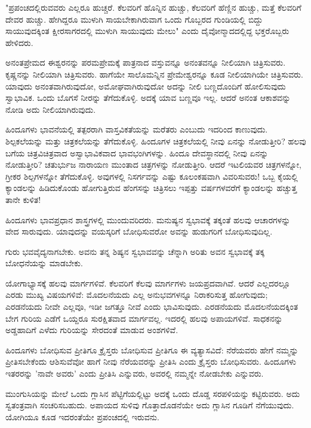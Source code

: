 "ಪ್ರಪಂಚದಲ್ಲಿರುವವರು ಎಲ್ಲರೂ ಹುಚ್ಚರೆ. ಕೆಲವರಿಗೆ ಹೊನ್ನಿನ ಹುಚ್ಚು, ಕೆಲವರಿಗೆ ಹೆಣ್ಣಿನ ಹುಚ್ಚು, ಮತ್ತೆ ಕೆಲವರಿಗೆ ದೇವರ ಹುಚ್ಚು. ಹೇಗಿದ್ದರೂ ಮುಳುಗಿ ಸಾಯಬೇಕಾಗಿರುವಾಗ ಒಂದು ಗೊಬ್ಬರದ ಗುಂಡಿಯಲ್ಲಿ ಬಿದ್ದು ಸಾಯುವುದಕ್ಕಿಂತ ಕ್ಷೀರಸಾಗರದಲ್ಲಿ ಮುಳುಗಿ ಸಾಯುವುದು ಮೇಲು" ಎಂದು ದೈವೋನ್ಮಾದದಲ್ಲಿದ್ದ ಭಕ್ತರೊಬ್ಬರು ಹೇಳಿದರು.

ಅನಂತಪ್ರೇಮದ ಈಶ್ವರನನ್ನು ಪರಮಪ್ರೇಮಕ್ಕೆ ಪಾತ್ರನಾದ ವಸ್ತುವನ್ನೂ ಅನಂತವನ್ನೂ ನೀಲಿಯಾಗಿ ಚಿತ್ರಿಸುವರು. ಕೃಷ್ಣನನ್ನು ನೀಲಿಯಾಗಿ ಚಿತ್ರಿಸುವರು. ಹಾಗೆಯೇ ಸಾಲೊಮನ್ನಿನ ಪ್ರೇಮೇಶ್ವರನ್ನೂ ಕೂಡ ನೀಲಿಯಾಗಿಯೇ ಚಿತ್ರಿಸುವರು. ಯಾವುದು ಅನಂತವಾಗಿರುವುದೋ, ಅಮೋಘವಾಗಿರುವುದೋ ಅದನ್ನು ನೀಲಿ ಬಣ್ಣದೊಂದಿಗೆ ಹೋಲಿಸುವುದು ಸ್ವಾಭಾವಿಕ. ಒಂದು ಬೊಗಸೆ ನೀರನ್ನು ತೆಗೆದುಕೊಳ್ಳಿ. ಅದಕ್ಕೆ ಯಾವ ಬಣ್ಣವೂ ಇಲ್ಲ. ಆದರೆ ಅನಂತ ಆಕಾಶವನ್ನು ನೋಡಿ ಅದು ನೀಲಿಯಾಗಿರುವುದು.

ಹಿಂದೂಗಳು ಭಾವನೆಯಲ್ಲಿ ತತ್ಪರರಾಗಿ ವಾಸ್ತವಿಕತೆಯನ್ನು ಮರೆತರು ಎಂಬುದು ಇದರಿಂದ ಕಾಣುವುದು. ಶಿಲ್ಪಕಲೆಯನ್ನು ಮತ್ತು ಚಿತ್ರಕಲೆಯನ್ನು ತೆಗೆದುಕೊಳ್ಳಿ. ಹಿಂದೂಗಳ ಚಿತ್ರಕಲೆಯಲ್ಲಿ ನೀವು ಏನನ್ನು ನೋಡುತ್ತೀರಿ? ಹಲವು ಬಗೆಯ ಚಿತ್ರವಿಚಿತ್ರವಾದ ಅಸ್ವಾಭಾವಿಕವಾದ ಭಾವಭಂಗಿಗಳನ್ನು. ಹಿಂದೂ ದೇವಸ್ಥಾನದಲ್ಲಿ ನೀವು ಏನನ್ನು ನೋಡುತ್ತೀರಿ? ಚತುರ್ಭುಜ ನಾರಾಯಣ ಮುಂತಾದ ಚಿತ್ರಗಳನ್ನು ನೋಡುತ್ತೀರಿ. ಆದರೆ ಇಟಲಿಯವರ ಚಿತ್ರಗಳನ್ನೋ, ಗ್ರೀಕರ ಶಿಲ್ಪಗಳನ್ನೋ ತೆಗೆದುಕೊಳ್ಳಿ. ಅವುಗಳಲ್ಲಿ ನಿಸರ್ಗವನ್ನು ಎಷ್ಟು ಕೂಲಂಕಷವಾಗಿ ವಿವರಿಸುವರು! ಒಬ್ಬ ಕೈಯಲ್ಲಿ ಕ್ಯಾಂಡಲನ್ನು ಹಿಡಿದುಕೊಂಡು ಹೋಗುತ್ತಿರುವ ಹೆಂಗಸನ್ನು ಚಿತ್ರಿಸಲು ಇಪ್ಪತ್ತು ವರ್ಷಗಳವರೆಗೆ ಕ್ಯಾಂಡಲನ್ನು ಹಚ್ಚುತ್ತ ತಾನೇ ಕುಳಿತ!

ಹಿಂದೂಗಳು ಭಾವಪ್ರಧಾನ ಶಾಸ್ತ್ರಗಳಲ್ಲಿ ಮುಂದುವರಿದರು. ಮನುಷ್ಯನ ಸ್ವಭಾವಕ್ಕೆ ತಕ್ಕಂತೆ ಹಲವು ಆಚಾರಗಳನ್ನು ವೇದ ಸಾರುವುದು. ಯಾವುದನ್ನು ವಯಸ್ಕರಿಗೆ ಬೋಧಿಸುವರೋ ಅವನ್ನು ಹುಡುಗರಿಗೆ ಬೋಧಿಸುವುದಿಲ್ಲ.

ಗುರು ಭವವೈದ್ಯನಾಗಬೇಕು. ಅವನು ತನ್ನ ಶಿಷ್ಯನ ಸ್ವಭಾವವನ್ನು ಚೆನ್ನಾಗಿ ಅರಿತು ಅವನ ಸ್ವಭಾವಕ್ಕೆ ತಕ್ಕ ಬೋಧನೆಯನ್ನು ಮಾಡಬೇಕು.

ಯೋಗಾಭ್ಯಾಸಕ್ಕೆ ಹಲವು ಮಾರ್ಗಗಳಿವೆ. ಕೆಲವರಿಗೆ ಕೆಲವು ಮಾರ್ಗಗಳು ಜಯಪ್ರದವಾಗಿವೆ. ಆದರೆ ಎಲ್ಲದರಲ್ಲೂ ಎರಡು ಮುಖ್ಯ ವಿಷಯಗಳಿವೆ: ಮೊದಲನೆಯದು ಎಲ್ಲ ಅನುಭವಗಳನ್ನೂ ನಿರಾಕರಿಸುತ್ತ ಹೋಗುವುದು; ಎರಡನೆಯದು ನೀವೇ ಎಲ್ಲವೂ, ಇಡೀ ಜಗತ್ತೂ ನೀವೆ ಎಂದು ಭಾವಿಸುವುದು. ಎರಡನೆಯದು ಮೊದಲನೆಯದಕ್ಕಿಂತ ಬೇಗ ಗುರಿಯ ಎಡೆಗೆ ಒಯ್ದರೂ ಸುರಕ್ಷಿತವಾದ ಮಾರ್ಗವಲ್ಲ. ಇದರಲ್ಲಿ ಹಲವು ಅಪಾಯಗಳಿವೆ. ಸಾಧಕನನ್ನು ಅಡ್ಡಹಾದಿಗೆ ಎಳೆದು ಗುರಿಯನ್ನು ಸೇರದಂತೆ ಮಾಡುವ ಅಂಶಗಳಿವೆ.

ಹಿಂದೂಗಳು ಬೋಧಿಸುವ ಪ್ರೀತಿಗೂ ಕ್ರೈಸ್ತರು ಬೋಧಿಸುವ ಪ್ರೀತಿಗೂ ಈ ವ್ಯತ್ಯಾಸವಿದೆ: ನೆರೆಯವರು ಹೇಗೆ ನಮ್ಮನ್ನು ಪ್ರೀತಿಸಬೇಕೆಂದು ಆಶಿಸುವೆವೋ ಹಾಗೆ ನೀವು ನೆರೆಯವರನ್ನು ಪ್ರೀತಿಸಿ ಎಂದು ಕ್ರೈಸ್ತರು ಬೋಧಿಸುವರು. ಹಿಂದೂಗಳು ಇತರರನ್ನು 'ನಾವೇ ಅವರು' ಎಂದು ಪ್ರೀತಿಸಿ ಎನ್ನುವರು, ಅವರಲ್ಲಿ ನಮ್ಮನ್ನೇ ನೋಡಬೇಕು ಎನ್ನುವರು.

ಮುಂಗುಸಿಯನ್ನು ಮೇಲೆ ಒಂದು ಗ್ಲಾಸಿನ ಪೆಟ್ಟಿಗೆಯಲ್ಲಿಟ್ಟು ಅದಕ್ಕೆ ಒಂದು ದೊಡ್ಡ ಸರಪಳಿಯನ್ನು ಕಟ್ಟಿರುವರು. ಅದು ಸ್ವತಂತ್ರವಾಗಿ ಸಂಚರಿಸಬಹುದು. ಅಪಾಯದ ಸುಳಿವು ಗೊತ್ತಾದೊಡನೆಯೇ ಅದು ಗ್ಲಾಸಿನ ಗೂಡಿಗೆ ನೆಗೆಯುವುದು. ಯೋಗಿಯೂ ಕೂಡ ಇದರಂತೆಯೇ ಪ್ರಪಂಚದಲ್ಲಿ ಇರುವನು.


